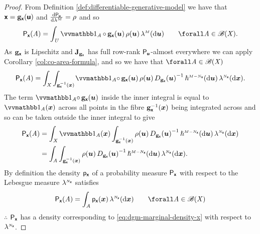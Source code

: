 \begin{proof}
From Definition \ref{def:differentiable-generative-model} we have that $\boldsymbol{\mathsf{x}} = {\mathbf{g}}_{\boldsymbol{\mathsf{x}}}(\boldsymbol{\mathsf{u}})$ and $\td{\prob{\rvct{u}}}{\lebm{M}} = \rho$ and so
\begin{equation*}
  \prob{\rvct{x}}(\set{A}) 
  =
  \int_{\set{U}} 
    \ind{\set{A}}\circ\,\genfunc_{\rvct{x}}(\vct{u})\,\rho(\vct{u})
  \,\lebm{M}(\dr\vct{u})
  \qquad \forall \set{A} \in\borel(\set{X}).
\end{equation*}
As ${\mathbf{g}}_{\boldsymbol{\mathsf{x}}}$ is Lipschitz and $\mathbf{J}_{{\mathbf{g}}_{\boldsymbol{\mathsf{x}}}}$ has full row-rank $\mathsf{P}_{\boldsymbol{\mathsf{u}}}$-almost everywhere we can apply Corollary \ref{col:co-area-formula}, and so we have that $\forall \set{A} \in\borel(\set{X})$
\begin{equation*}
  \prob{\rvct{x}}(\set{A}) =
  \int_{\set{X}}
  \int_{\preimage{\genfunc_{\rvct{x}}}{\vct{x}}}\kern-1pt
    \ind{\set{A}}\!\circ\,\genfunc_{\rvct{x}}(\vct{u})\,\rho(\vct{u})\,
    \jacobproddet{\genfunc_{\rvct{x}}}{\vct{u}}^{-1}
  \,\haum{M-{N_{\rvct{x}}}}(\dr\vct{u})
  \,\lebm{N_{\rvct{x}}}(\dr\vct{x}).
\end{equation*}
The term $\ind{\set{A}}\!\circ\,\genfunc_{\rvct{x}}(\vct{u})$ inside the inner integral is equal to $\ind{\set{A}}(\vct{x})$ across all points in the fibre ${\mathbf{g}}_{\boldsymbol{\mathsf{x}}}^{-1}(\boldsymbol{x})$ being integrated across and so can be taken outside the inner integral to give
\begin{align*}
  \prob{\rvct{x}}(\set{A})
  &=
  \int_{\set{X}}
  \ind{\set{A}}(\vct{x})
  \int_{\preimage{\genfunc_{\rvct{x}}}{\vct{x}}} 
   \rho(\vct{u})\,
   \jacobproddet{\genfunc_{\rvct{x}}}{\vct{u}}^{-1}
  \,\haum{M-{N_{\rvct{x}}}}(\dr\vct{u})
  \,\lebm{N_{\rvct{x}}}(\dr\vct{x})\\
  &=
  \int_{\set{A}}
  \int_{\preimage{\genfunc_{\rvct{x}}}{\vct{x}}} 
   \rho(\vct{u})\,
   \jacobproddet{\genfunc_{\rvct{x}}}{\vct{u}}^{-1}
  \,\haum{M-{N_{\rvct{x}}}}(\dr\vct{u})
  \,\lebm{N_{\rvct{x}}}(\dr\vct{x}).
\end{align*}
By definition the density $\mathsf{p}_{\boldsymbol{\mathsf{x}}}$ of a probability measure $\mathsf{P}_{\boldsymbol{\mathsf{x}}}$ with respect to the Lebesgue measure $\lebm{N_{\rvct{x}}}$ satisfies
\begin{equation*}
  \prob{\rvct{x}}(\set{A}) = \int_{\set{A}} \pden{\rvct{x}}(\vct{x}) \,\lebm{N_{\rvct{x}}}(\dr\vct{x})
  \qquad \forall \set{A} \in \borel(\set{X})
\end{equation*}
$\therefore$ $\mathsf{P}_{\boldsymbol{\mathsf{x}}}$ has a density corresponding to \eqref{eq:dgm-marginal-density-x} with respect to $\lebm{N_{\rvct{x}}}$. \qedhere
\end{proof}
